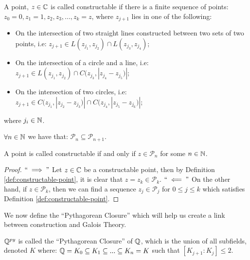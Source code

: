 \begin{definition}\label{def:constructable-point}
    A point, $z \in \mathbb C$ is called constructable if there is a finite sequence of points:
    $z_0=0,z_1=1,z_2,z_3,...,z_k=z$, where $z_{j+1}$ lies in one of the following:
    \begin{itemize}
        \item On the intersection of two straight lines constructed between two sets of two points, i.e:
        $z_{j+1}\in L(z_{j_1},z_{j_2})\cap L(z_{j_3},z_{j_4})$;
        \item On the intersection of a circle and a line, i.e:
        $z_{j+1}\in L(z_{j_1},z_{j_2})\cap C(z_{j_3},|z_{j_4}-z_{j_5})|$;
        \item On the intersection of two circles, i.e:
        $z_{j+1}\in C(z_{j_1},|z_{j_2}-z_{j_3})|\cap C(z_{j_4},|z_{j_5}-z_{j_6})|$;
    \end{itemize}
    where $j_i\in \mathbb N$.
\end{definition}

\begin{lemma}\label{thm:point-subset}
    $\forall n \in \mathbb N$ we have that:
    $\mathcal{P}_n \subseteq \mathcal{P}_{n+1}$. 
\end{lemma}


\begin{theorem}
    A point is called constructable if and only if $z\in \mathcal{P}_n$ for some $n\in \mathbb N$. 
\end{theorem}

\begin{proof}  
    $``\implies"$ Let $z \in \mathbb C$ be a constructable point, then by Definition \ref{def:constructable-point}, it is clear that $z=z_k\in \mathcal{P}_k$.
    $``\impliedby"$ On the other hand, if $z \in \mathcal{P}_k$, then we can find a sequence $z_j \in \mathcal{P}_j$ for $0\leq j \leq k$ which satisfies Definition \ref{def:constructable-point}.
\end{proof}

We now define the ``Pythagorean Closure'' which will help us create a link between construction and Galois Theory.

\begin{definition}
    $\mathbb Q^{py}$ is called the ``Pythagorean Closure'' of $\mathbb Q$, which is the union of all subfields, denoted $K$ where:
    $\mathbb Q = K_0 \subseteq K_1 \subseteq ... \subseteq K_n=K$ such that $[K_{j+1}:K_j]\leq 2$.
\end{definition}

